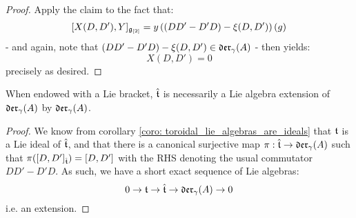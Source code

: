 \begin{proof}
                Apply the claim to the fact that:
                    $$[X(D, D'), Y]_{\mathfrak{g}_{[2]}} = y \left( ( DD' - D'D) - \xi(D, D') \right)( g )$$
                - and again, note that $( DD' - D'D) - \xi(D, D') \in \mathfrak{der}_{\gamma}(A)$ - then yields:
                    $$X(D, D') = 0$$
                precisely as desired. 
            \end{proof}
        \begin{corollary} \label{coro: yangian_extended_toroidal_lie_algebras_are_extensions}
            When endowed with a Lie bracket, $\hat{\mathfrak{t}}$ is necessarily a Lie algebra extension of $\mathfrak{der}_{\gamma}(A)$ by $\mathfrak{der}_{\gamma}(A)$.
        \end{corollary}
            \begin{proof}
                We know from corollary \ref{coro: toroidal_lie_algebras_are_ideals} that $\mathfrak{t}$ is a Lie ideal of $\hat{\mathfrak{t}}$, and that there is a canonical surjective map $\pi: \hat{\mathfrak{t}} \to \mathfrak{der}_{\gamma}(A)$ such that $\pi([D, D']_{\hat{\mathfrak{t}}}) = [D, D']$ with the RHS denoting the usual commutator $DD' - D'D$. As such, we have a short exact sequence of Lie algebras:
                    $$0 \to \mathfrak{t} \to \hat{\mathfrak{t}} \to \mathfrak{der}_{\gamma}(A) \to 0$$
                i.e. an extension.
            \end{proof}
            
